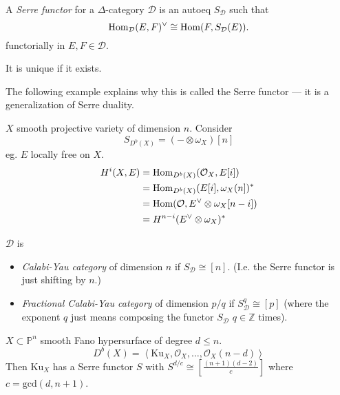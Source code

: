 \begin{definition}
\label{definition-Serre-functor}
A {\it Serre functor} for a $\Delta$-category $\mathcal{D}$ is an autoeq
$S_{\mathcal{D}}$ such that
$$
\mathop{\mathrm{Hom}}\nolimits_{\mathcal{D}}(E,F)^\vee \cong \mathop{\mathrm{Hom}}\nolimits(F,S_{\mathcal{D}}(E)).
$$
functorially in $E,F \in \mathcal{D}$.
\end{definition}

\begin{remark}
\label{remark-uniqueness-of-Serre-functor}
It is unique if it exists.
\end{remark}

The following example explains why this is called the Serre functor --- it is a
generalization of Serre duality.

\begin{example}
\label{example-Serre-functor-is-Serre-duality}
$X$ smooth projective variety of dimension $n$. Consider
$$
S_{D^b(X)}=(-\otimes \omega_X)[n]
$$
eg. $E$ locally free on $X$.
\begin{align*}
H^{i}(X,E)&=\mathop{\mathrm{Hom}}\nolimits_{D^b(X)}(\mathcal{O}_X,E[i])\\
& =\mathop{\mathrm{Hom}}\nolimits_{D^b(X)}(E[i],\omega_X(n])^* \\
&=\mathop{\mathrm{Hom}}\nolimits(\mathcal{O},E^\vee \otimes \omega_X[n-i])\\
&=H^{n-i}(E^{\vee}\otimes \omega_X)^*
\end{align*}
\end{example}

\begin{definition}
\label{definition-Calabi-Yau-category}
$\mathcal{D}$ is
\begin{itemize}
\item {\it Calabi-Yau category} of dimension $n$ if $S_{\mathcal{D}}\cong[n]$.
(I.e. the Serre functor is just shifting by $n$.)
\item {\it Fractional Calabi-Yau category} of dimension $p/q$ if
$S^q_{\mathcal{D}}\cong[p]$ (where the exponent $q$ just means composing the
functor $S_{\mathcal{D}}$ $q \in \mathbb{Z}$ times).
\end{itemize}
\end{definition}

\begin{theorem}[Kuznetsov]
\label{theorem-Kuznetsov}
$X \subset \mathbb{P}^n$ smooth Fano hypersurface of degree $d \leq n$.
$$
D^b(X)=\left<\text{Ku}_X,\mathcal{O}_X,\ldots,\mathcal{O}_X(n-d)\right>
$$
Then $\text{Ku}_X$ has a Serre functor $S$ with
$S^{d/c}\cong\left[\frac{(n+1)(d-2)}{c}\right]$ where 
 $c=\text{gcd}(d,n+1)$.
\end{theorem}

